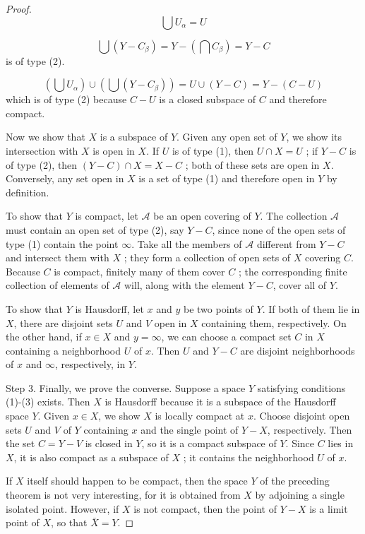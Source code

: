 \begin{proof}
\[
\bigcup {U}_{\alpha } = U
\]

\[
\bigcup ( {Y - C_{\beta }}) = Y - ( {\bigcap {C}_{\beta }}) = Y - C
\]
 is of type (2).

\[
( {\bigcup {U}_{\alpha }}) \cup ( {\bigcup ( {Y - C_{\beta }}) }) = U \cup ( {Y - C}) = Y - ( {C - U})
\]
which is of type (2) because \(C - U\) is a closed subspace of \(C\) and therefore compact.

Now we show that \(X\) is a subspace of \(Y\). Given any open set of \(Y\), we show its intersection with \(X\) is open in \(X\). If \(U\) is of type (1), then \(U \cap X = U\) ; if \(Y - C\) is of type (2), then \(( {Y - C}) \cap X = X - C\) ; both of these sets are open in \(X\). Conversely, any set open in \(X\) is a set of type (1) and therefore open in \(Y\) by definition.

To show that \(Y\) is compact, let \(\mathcal{A}\) be an open covering of \(Y\). The collection \(\mathcal{A}\) must contain an open set of type (2), say \(Y - C\), since none of the open sets of type (1) contain the point \(\infty\). Take all the members of \(\mathcal{A}\) different from \(Y - C\) and intersect them with \(X\) ; they form a collection of open sets of \(X\) covering \(C\). Because \(C\) is compact, finitely many of them cover \(C\) ; the corresponding finite collection of elements of \(\mathcal{A}\) will, along with the element \(Y - C\), cover all of \(Y\).

To show that \(Y\) is Hausdorff, let \(x\) and \(y\) be two points of \(Y\). If both of them lie in \(X\), there are disjoint sets \(U\) and \(V\) open in \(X\) containing them, respectively. On the other hand, if \(x \in X\) and \(y = \infty\), we can choose a compact set \(C\) in \(X\) containing a neighborhood \(U\) of \(x\). Then \(U\) and \(Y - C\) are disjoint neighborhoods of \(x\) and \(\infty\), respectively, in \(Y\).

Step 3. Finally, we prove the converse. Suppose a space \(Y\) satisfying conditions (1)-(3) exists. Then \(X\) is Hausdorff because it is a subspace of the Hausdorff space \(Y\). Given \(x \in X\), we show \(X\) is locally compact at \(x\). Choose disjoint open sets \(U\) and \(V\) of \(Y\) containing \(x\) and the single point of \(Y - X\), respectively. Then the set \(C = Y - V\) is closed in \(Y\), so it is a compact subspace of \(Y\). Since \(C\) lies in \(X\), it is also compact as a subspace of \(X\) ; it contains the neighborhood \(U\) of \(x\).

If \(X\) itself should happen to be compact, then the space \(Y\) of the preceding theorem is not very interesting, for it is obtained from \(X\) by adjoining a single isolated point. However, if \(X\) is not compact, then the point of \(Y - X\) is a limit point of \(X\), so that \(\bar{X} = Y\).
\end{proof}

